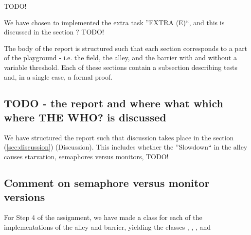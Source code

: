 
TODO!

We have chosen to implemented the extra task ''EXTRA (E)``, and this is discussed in the section ? TODO!

The body of the report is structured such that each section corresponds to a part of the playground - i.e. the field, the alley, and the barrier with and without a variable threshold. Each of these sections contain a subsection describing tests and, in a single case, a formal proof.

\subsection{TODO - the report and where what which where THE WHO? is discussed}
We have structured the report such that discussion takes place in the section (\ref{sec:discussion}) (Discussion). This includes whether the ''Slowdown`` in the alley causes starvation, semaphores versus monitors, TODO!

\subsection{Comment on semaphore versus monitor versions}
\label{sub:sema-vs-moni}
For Step 4 of the assignment, we have made a class for each of the implementations of the alley and barrier, yielding the classes , , , and 